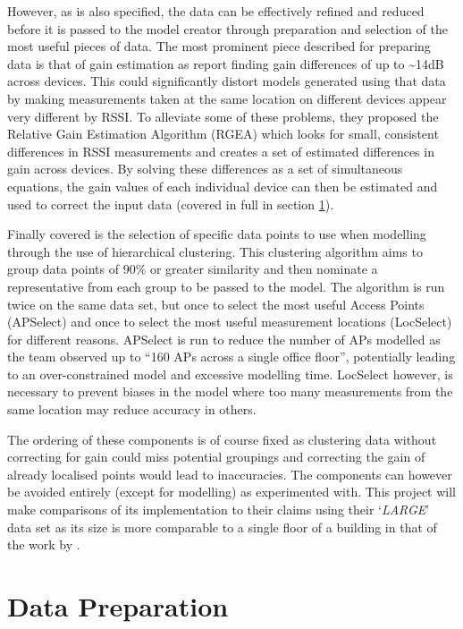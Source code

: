 \documentclass{UoYCSproject}
\begin{document}
            However, as is also specified, the data can be effectively refined and reduced before it is passed to the model creator through preparation and selection of the most useful pieces of data. The most prominent piece described for preparing data is that of gain estimation as \citeauthor{chintalapudi2010indoor} report finding gain differences of up to \textasciitilde14dB across devices. This could significantly distort models generated using that data by making measurements taken at the same location on different devices appear very different by RSSI. To alleviate some of these problems, they proposed the Relative Gain Estimation Algorithm (RGEA) which looks for small, consistent differences in RSSI measurements and creates a set of estimated differences in gain across devices. By solving these differences as a set of simultaneous equations, the gain values of each individual device can then be estimated and used to correct the input data (covered in full in section \ref{sec:dataprep}).
            
            Finally covered is the selection of specific data points to use when modelling through the use of hierarchical clustering. This clustering algorithm aims to group data points of 90\% or greater similarity and then nominate a representative from each group to be passed to the model. The algorithm is run twice on the same data set, but once to select the most useful Access Points (APSelect) and once to select the most useful measurement locations (LocSelect) for different reasons. APSelect is run to reduce the number of APs modelled as the team observed up to ``160 APs across a single office floor'', potentially leading to an over-constrained model and excessive modelling time. LocSelect however, is necessary to prevent biases in the model where too many measurements from the same location may reduce accuracy in others.
            
            The ordering of these components is of course fixed as clustering data without correcting for gain could miss potential groupings and correcting the gain of already localised points would lead to inaccuracies. The components can however be avoided entirely (except for modelling) as \citeauthor{chintalapudi2010indoor} experimented with. This project will make comparisons of its implementation to their claims using their `\emph{LARGE}' data set as its size is more comparable to a single floor of a building in that of the work by \citet{torres2014ujiindoorloc}.
		
		\section{Data Preparation}
        \label{sec:dataprep}
        
\end{document}
